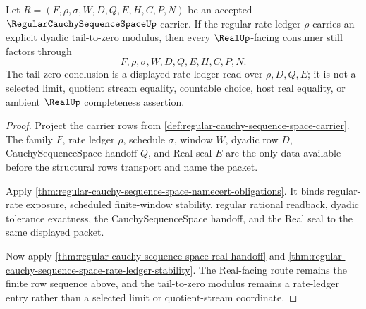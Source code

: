 \begin{theorem}
\label{thm:regular-cauchy-sequence-space-tail-zero-route}
Let $R=(F,\rho,\sigma,W,D,Q,E,H,C,P,N)$ be an accepted $\RegularCauchySequenceSpaceUp$ carrier. If the regular-rate ledger $\rho$ carries an explicit dyadic tail-to-zero modulus, then every $\RealUp$-facing consumer still factors through
$$
F,\rho,\sigma,W,D,Q,E,H,C,P,N.
$$
The tail-zero conclusion is a displayed rate-ledger read over $\rho,D,Q,E$; it is not a selected limit, quotient stream equality, countable choice, host real equality, or ambient $\RealUp$ completeness assertion.
\end{theorem}
\begin{proof}
Project the carrier rows from \autoref{def:regular-cauchy-sequence-space-carrier}. The family $F$, rate ledger $\rho$, schedule $\sigma$, window $W$, dyadic row $D$, CauchySequenceSpace handoff $Q$, and Real seal $E$ are the only data available before the structural rows transport and name the packet.

Apply \autoref{thm:regular-cauchy-sequence-space-namecert-obligations}. It binds regular-rate exposure, scheduled finite-window stability, regular rational readback, dyadic tolerance exactness, the CauchySequenceSpace handoff, and the Real seal to the same displayed packet.

Now apply \autoref{thm:regular-cauchy-sequence-space-real-handoff} and \autoref{thm:regular-cauchy-sequence-space-rate-ledger-stability}. The Real-facing route remains the finite row sequence above, and the tail-to-zero modulus remains a rate-ledger entry rather than a selected limit or quotient-stream coordinate.
\end{proof}


\begin{closurestatus}{\RegularCauchySequenceSpaceUp}
  \theoryclosure{\seedClosure}
  \formalstatus{\unformalizedV}
\end{closurestatus}
